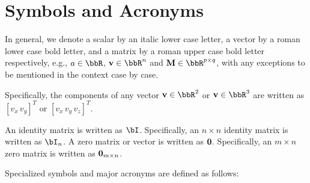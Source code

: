 \chapter*{Symbols and Acronyms}

In general, we denote a scalar by an italic lower case letter,
a vector by a roman lower case bold letter,
and a matrix by a roman upper case bold letter respectively, e.g.,
$a \in \bbR$, $\mathbf{v} \in \bbR^n$ and $\mathbf{M} \in \bbR^{p \times q}$, with any exceptions to be mentioned in the context case by case.

Specifically, the components of any vector ${\bf v} \in \bbR^2$ or ${\bf v}\in \bbR^3$ are written as $[v_x\,v_y]^T$ or $[v_x\,v_y\,v_z]^T$.

An identity matrix is written as $\bI$. Specifically, an $n\times n$ identity matrix is written as $\bI_n$.
A zero matrix or vector is written as ${\bf 0}$. Specifically, an $m\times n$ zero matrix is written as ${\bf 0}_{m\times n}$.

Specialized symbols and major acronyms are defined as follows:

\newpage

